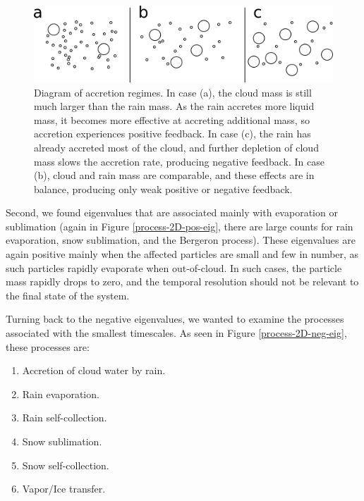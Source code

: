 \documentclass [11pt, proquest] {uwthesis}[2020/02/24]
\begin{document}
\begin{figure}[ht]
  \includegraphics[width=6.5in]{./accretion_regimes.png}
  \caption{Diagram of accretion regimes. In case (a), the cloud mass is still much larger than the rain mass. As the rain accretes more liquid mass, it becomes more effective at accreting additional mass, so accretion experiences positive feedback. In case (c), the rain has already accreted most of the cloud, and further depletion of cloud mass slows the accretion rate, producing negative feedback. In case (b), cloud and rain mass are comparable, and these effects are in balance, producing only weak positive or negative feedback.}
  \label{accretion-regimes}
\end{figure}

Second, we found eigenvalues that are associated mainly with evaporation or sublimation (again in Figure \ref{process-2D-pos-eig}, there are large counts for rain evaporation, snow sublimation, and the Bergeron process). These eigenvalues are again positive mainly when the affected particles are small and few in number, as such particles rapidly evaporate when out-of-cloud. In such cases, the particle mass rapidly drops to zero, and the temporal resolution should not be relevant to the final state of the system.

Turning back to the negative eigenvalues, we wanted to examine the processes associated with the smallest timescales. As seen in Figure \ref{process-2D-neg-eig}, these processes are:

\begin{enumerate}
\item Accretion of cloud water by rain.
\item Rain evaporation.
\item Rain self-collection.
\item Snow sublimation.
\item Snow self-collection.
\item Vapor/Ice transfer.
\end{enumerate}
\end{document}
